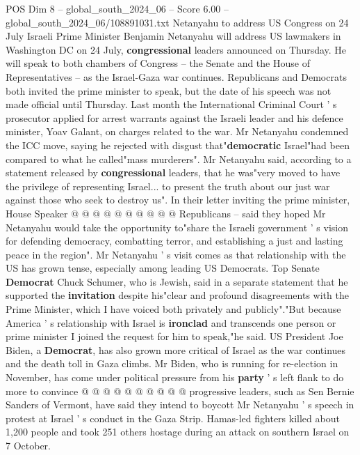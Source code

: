 \begin{textsample}{POS Dim 8 – global\_south\_2024\_06 – Score 6.00 – global\_south\_2024\_06/108891031.txt}  \label{ex:f8_pos_213}
Netanyahu to address US Congress on 24 July Israeli Prime Minister Benjamin Netanyahu will address US lawmakers in Washington DC on 24 July, \textbf{congressional} leaders announced on Thursday.
He will speak to both chambers of Congress -- the Senate and the House of Representatives -- as the Israel-Gaza war continues.
Republicans and Democrats both invited the prime minister to speak, but the date of his speech was not made official until Thursday.
Last month the International Criminal Court ' s prosecutor applied for arrest warrants against the Israeli leader and his defence minister, Yoav Galant, on charges related to the war.
Mr Netanyahu condemned the ICC move, saying he rejected with disgust that"\textbf{democratic} Israel"had been compared to what he called"mass murderers".
Mr Netanyahu said, according to a statement released by \textbf{congressional} leaders, that he was"very moved to have the privilege of representing Israel... to present the truth about our just war against those who seek to destroy us".
In their letter inviting the prime minister, House Speaker @ @ @ @ @ @ @ @ @ @ Republicans -- said they hoped Mr Netanyahu would take the opportunity to"share the Israeli government ' s vision for defending democracy, combatting terror, and establishing a just and lasting peace in the region".
Mr Netanyahu ' s visit comes as that relationship with the US has grown tense, especially among leading US Democrats.
Top Senate \textbf{Democrat} Chuck Schumer, who is Jewish, said in a separate statement that he supported the \textbf{invitation} despite his"clear and profound disagreements with the Prime Minister, which I have voiced both privately and publicly"."But because America ' s relationship with Israel is \textbf{ironclad} and transcends one person or prime minister I joined the request for him to speak,"he said.
US President Joe Biden, a \textbf{Democrat}, has also grown more critical of Israel as the war continues and the death toll in Gaza climbs.
Mr Biden, who is running for re-election in November, has come under political pressure from his \textbf{party} ' s left flank to do more to convince @ @ @ @ @ @ @ @ @ @ progressive leaders, such as Sen Bernie Sanders of Vermont, have said they intend to boycott Mr Netanyahu ' s speech in protest at Israel ' s conduct in the Gaza Strip.
Hamas-led fighters killed about 1,200 people and took 251 others hostage during an attack on southern Israel on 7 October.

\end{textsample}

